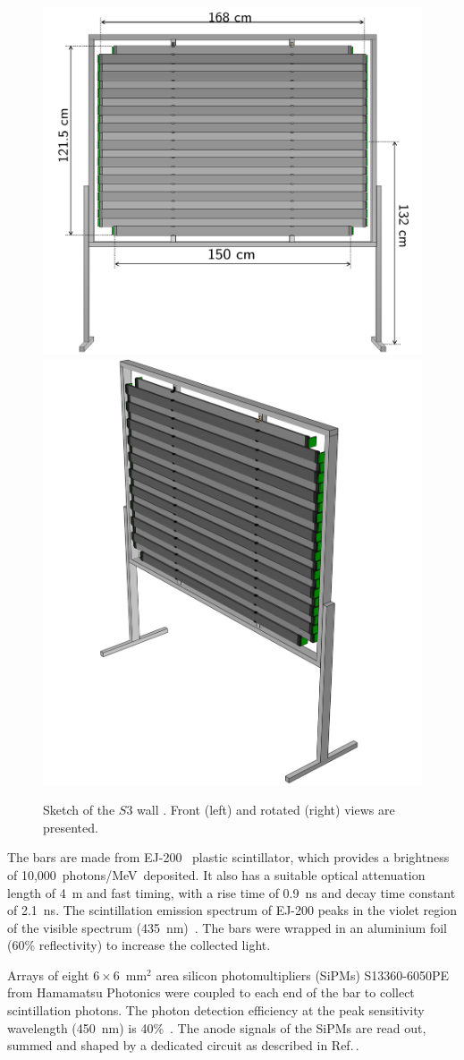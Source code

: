 \begin{figure}
  \centering
  \includegraphics[width=0.54\linewidth]{files/Figures/uToF_sketch.pdf}
  \hfill
  \includegraphics[width=0.43\linewidth]{files/Figures/uTOF_rot.pdf}
  \caption{Sketch of the $\mathit{S3}$ wall \cite{S3-proceedings}.
  Front (left) and rotated (right) views are presented.}
  \label{fig:S3sketch}
\end{figure}

The bars are made from EJ-200~\cite{SCIONIX} plastic scintillator, which provides a brightness of 10,000~photons/MeV~deposited.
It also has a suitable optical attenuation length of 4~m and fast timing, with a rise time of 0.9~ns and decay time constant of 2.1~ns.
The scintillation emission spectrum of EJ-200 peaks in the violet region of the visible spectrum (435~nm)~\cite{EJ200}.
The bars were wrapped in an aluminium foil (60\% reflectivity) to increase the collected light.

Arrays of eight $6 \times 6$~mm$^2$ area silicon photomultipliers (SiPMs) S13360-6050PE from Hamamatsu Photonics \cite{Hamamatsu} were coupled to each end of the bar to collect scintillation photons.
The photon detection efficiency at the peak sensitivity wavelength (450~nm) is 40\%~\cite{Hamamatsu}.
The anode signals of the SiPMs are read out, summed and shaped by a dedicated circuit as described in Ref.\,\cite{S3-readout}.

